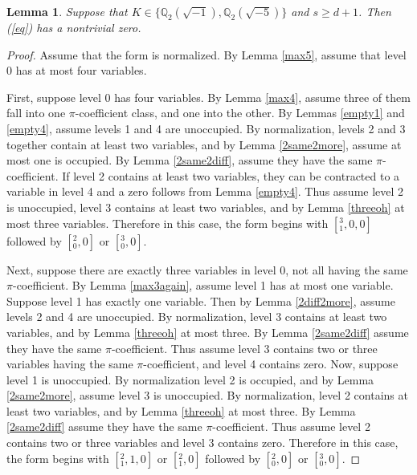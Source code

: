 \documentclass[12pt]{amsart}
\newtheorem{lemma}{Lemma}
\begin{document}
\begin{lemma} \label{final}
Suppose that $K \in \{\mathbb{Q}_2(\sqrt{-1}), \mathbb{Q}_2(\sqrt{-5})\}$ and $s \ge d+1$.  Then (\ref{eq}) has a nontrivial zero.
\end{lemma}
\begin{proof}
Assume that the form is normalized.  By Lemma \ref{max5}, assume that level 0 has at most four variables.

First, suppose level 0 has four variables.  By Lemma \ref{max4}, assume three of them fall into one $\pi$-coefficient class, and one into the other.  By Lemmas \ref{empty1} and \ref{empty4}, assume levels 1 and 4 are unoccupied.  By normalization, levels 2 and 3 together contain at least two variables, and by Lemma \ref{2same2more}, assume at most one is occupied.  By Lemma \ref{2same2diff}, assume they have the same $\pi$-coefficient.  If level 2 contains at least two variables, they can be contracted to a variable in level 4 and a zero follows from Lemma \ref{empty4}.  Thus assume level 2 is unoccupied, level 3 contains at least two variables, and by Lemma \ref{threeoh} at most three variables.  Therefore in this case, the form begins with $[{}^3_1,0,0]$ followed by $[{}^2_0,0]$ or $[{}^3_0,0]$.


Next, suppose there are exactly three variables in level 0, not all having the same $\pi$-coefficient.  By Lemma \ref{max3again}, assume level 1 has at most one variable.  Suppose level 1 has exactly one variable.  Then by Lemma \ref{2diff2more}, assume levels 2 and 4 are unoccupied.  By normalization, level 3 contains at least two variables, and by Lemma \ref{threeoh} at most three.  By Lemma \ref{2same2diff} assume they have the same $\pi$-coefficient.  Thus assume level 3 contains two or three variables having the same $\pi$-coefficient, and level 4 contains zero.  Now, suppose level 1 is unoccupied.  By normalization level 2 is occupied, and by Lemma \ref{2same2more}, assume level 3 is unoccupied.  By normalization, level 2 contains at least two variables, and by Lemma \ref{threeoh} at most three.  By Lemma \ref{2same2diff} assume they have the same $\pi$-coefficient.  Thus assume level 2 contains two or three variables and level 3 contains zero.  Therefore in this case, the form begins with $[{}^2_1,1,0]$ or $[{}^2_1, 0]$ followed by $[{}^2_0,0]$ or $[{}^3_0,0]$.


\end{proof}
\end{document}
